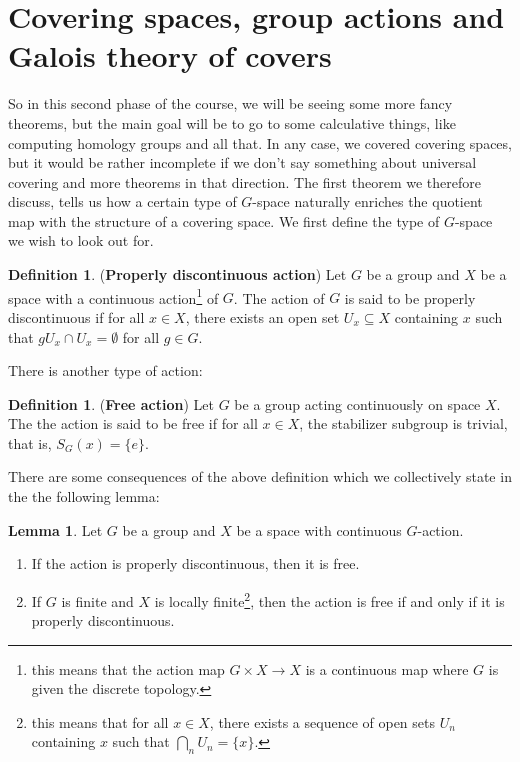 \documentclass[letterpaper,11pt,twoside]{article}
\theoremstyle{definition}
\theoremstyle{definition}
\newtheorem{definition}[proposition]{Definition}
\theoremstyle{definition}
\theoremstyle{definition}
\newtheorem{lemma}[proposition]{\textbf{Lemma}}
\theoremstyle{definition}
\theoremstyle{definition}
\theoremstyle{remark}
\theoremstyle{definition}
\begin{document}
\section{Covering spaces, group actions and Galois theory of covers}
So in this second phase of the course, we will be seeing some more fancy theorems, but the main goal will be to go to some calculative things, like computing homology groups and all that. In any case, we covered covering spaces, but it would be rather incomplete if we don't say something about universal covering and more theorems in that direction. The first theorem we therefore discuss, tells us how a certain type of $G$-space naturally enriches the quotient map with the structure of a covering space. We first define the type of $G$-space we wish to look out for.
\begin{definition}
(\textbf{Properly discontinuous action}) Let $G$ be a group and $X$ be a space with a continuous action\footnote{this means that the action map $G\times X \to X$ is a continuous map where $G$ is given the discrete topology.} of $G$. The action of $G$ is said to be properly discontinuous if for all $x\in X$, there exists an open set $U_x \subseteq X$ containing $x$ such that $gU_x \cap U_x = \emptyset$ for all $g\in G$.
\end{definition}
There is another type of action:
\begin{definition}
(\textbf{Free action}) Let $G$ be a group acting continuously on space $X$. The the action is said to be free if for all $x\in X$, the stabilizer subgroup is trivial, that is, $S_G(x) = \{e\}$.
\end{definition}
There are some consequences of the above definition which we collectively state in the the following lemma:
\begin{lemma}\label{L-6.0.3}
Let $G$ be a group and $X$ be a space with continuous $G$-action.
\begin{enumerate}
    \item{If the action is properly discontinuous, then it is free.}
    \item{If $G$ is finite and $X$ is locally finite\footnote{this means that for all $x\in X$, there exists a sequence of open sets $U_n$ containing $x$ such that $\bigcap_n U_n = \{x\}$.}, then the action is free if and only if it is properly discontinuous.}
\end{enumerate}
\end{lemma}
\end{document}
